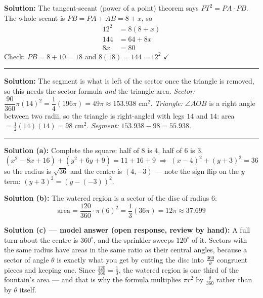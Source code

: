 \documentclass[12pt]{article}
\begin{document}

\textbf{Solution:} The tangent-secant (power of a point) theorem says
$PT^2 = PA \cdot PB$. The whole secant is $PB = PA + AB = 8 + x$, so
\begin{align*}
  12^2 &= 8(8 + x) \\
  144 &= 64 + 8x \\
  8x &= 80
\end{align*}
Check: $PB = 8 + 10 = 18$ and $8(18) = 144 = 12^2$ $\checkmark$

\vspace{0.2cm}\noindent\rule{\linewidth}{0.2pt}


\textbf{Solution:} The segment is what is left of the sector once the triangle is
removed, so this needs the sector formula \emph{and} the triangle area.
\emph{Sector:} $\dfrac{90}{360}\pi(14)^2 = \dfrac{1}{4}(196\pi) = 49\pi \approx 153.938$ cm$^2$.
\emph{Triangle:} $\angle AOB$ is a right angle between two radii, so the triangle is
right-angled with legs $14$ and $14$: area $= \tfrac{1}{2}(14)(14) = 98$ cm$^2$.
\emph{Segment:} $153.938 - 98 = 55.938$.

\vspace{0.2cm}\noindent\rule{\linewidth}{0.2pt}


\textbf{Solution (a):} Complete the square: half of $8$ is $4$, half of $6$ is $3$,
\[
  (x^2 - 8x + 16) + (y^2 + 6y + 9) = 11 + 16 + 9 \;\Longrightarrow\; (x-4)^2 + (y+3)^2 = 36
\]
so the radius is $\sqrt{36}$ and the centre is $(4,-3)$ --- note the sign flip on the
$y$ term: $(y+3)^2 = (y - (-3))^2$.

\textbf{Solution (b):} The watered region is a sector of the disc of radius $6$:
\[
  \text{area} = \frac{120}{360}\cdot \pi (6)^2 = \frac{1}{3}(36\pi) = 12\pi \approx 37.699
\]

\textbf{Solution (c) --- model answer (open response, review by hand):}
A full turn about the centre is $360^\circ$, and the sprinkler sweeps $120^\circ$ of
it. Sectors with the same radius have areas in the same ratio as their central
angles, because a sector of angle $\theta$ is exactly what you get by cutting the
disc into $\tfrac{360}{\theta}$ congruent pieces and keeping one. Since
$\tfrac{120}{360} = \tfrac{1}{3}$, the watered region is one third of the fountain's
area --- and that is why the formula multiplies $\pi r^2$ by $\tfrac{\theta}{360}$
rather than by $\theta$ itself.
\end{document}
